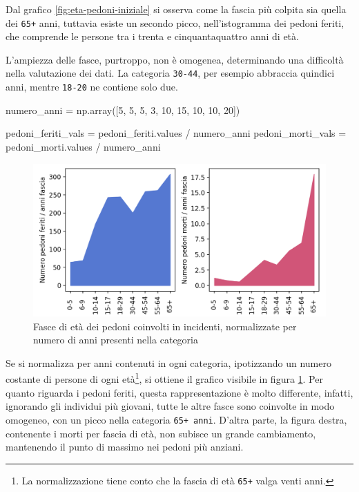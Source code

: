 \documentclass[a4paper]{report}
\newcommand{\columnstyle}[1]{\texttt{#1}}
\begin{document}
Dal grafico \ref{fig:eta-pedoni-iniziale} si osserva come la fascia più colpita 
sia quella dei \columnstyle{65+} anni, tuttavia esiste un secondo picco, nell'istogramma 
dei pedoni feriti, che comprende le persone tra i trenta e cinquantaquattro anni di età. 

L'ampiezza delle fasce, purtroppo, non è omogenea, determinando una difficoltà 
nella valutazione dei dati.
La categoria 
\columnstyle{30-44}, per esempio abbraccia quindici anni, mentre 
\columnstyle{18-20} ne contiene solo due. 

\begin{code}[language=Python]
numero_anni = np.array([5, 5, 5, 3, 10, 15, 10, 10, 20])

pedoni_feriti_vals = pedoni_feriti.values / numero_anni
pedoni_morti_vals = pedoni_morti.values / numero_anni
\end{code}

\begin{figure}
    \includegraphics[width=\linewidth]{../src/incidenti/incidenti_senza_coords/pedoni/eta_pedoni.png}
    \caption{Fasce di età dei pedoni coinvolti in incidenti, normalizzate per numero di anni 
    presenti nella categoria}
    \label{fig:eta-pedoni}
\end{figure}

Se si normalizza per anni contenuti in ogni categoria, ipotizzando un numero 
costante di persone di ogni età\footnote{La normalizzazione tiene conto 
che la fascia di età \columnstyle{65+} valga venti anni.}, 
si ottiene il grafico visibile in figura \ref{fig:eta-pedoni}. 
Per quanto riguarda i pedoni feriti, 
questa rappresentazione è molto differente, infatti, 
ignorando gli individui più giovani, tutte le altre fasce sono coinvolte 
in modo omogeneo, con un picco nella categoria \columnstyle{65+ anni}. 
D'altra parte, la figura destra, contenente i morti per fascia di età, 
non subisce un grande cambiamento, mantenendo il punto di massimo nei 
pedoni più anziani. 
\end{document}
